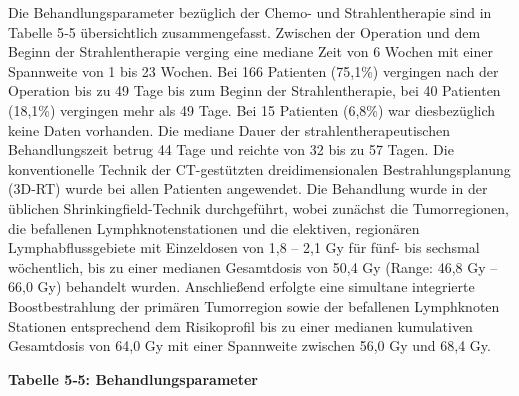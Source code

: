 Die Behandlungsparameter bezüglich der Chemo- und Strahlentherapie sind in Tabelle 5‑5 übersichtlich zusammengefasst. Zwischen der Operation und dem Beginn der Strahlentherapie verging eine mediane Zeit von 6 Wochen mit einer Spannweite von 1 bis 23 Wochen. Bei 166 Patienten (75,1\%) vergingen nach der Operation bis zu 49 Tage bis zum Beginn der Strahlentherapie, bei 40 Patienten (18,1\%) vergingen mehr als 49 Tage. Bei 15 Patienten (6,8\%) war diesbezüglich keine Daten vorhanden. Die mediane Dauer der strahlentherapeutischen Behandlungszeit betrug 44 Tage und reichte von 32 bis zu 57 Tagen. Die konventionelle Technik der CT-gestützten dreidimensionalen Bestrahlungsplanung (3D-RT) wurde bei allen Patienten angewendet. Die Behandlung wurde in der üblichen Shrinkingfield-Technik durchgeführt, wobei zunächst die Tumorregionen, die befallenen Lymphknotenstationen und die elektiven, regionären Lymphabflussgebiete mit Einzeldosen von 1,8 -- 2,1 Gy für fünf- bis sechsmal wöchentlich, bis zu einer medianen Gesamtdosis von 50,4 Gy (Range: 46,8 Gy -- 66,0 Gy) behandelt wurden. Anschließend erfolgte eine simultane integrierte Boostbestrahlung der primären Tumorregion sowie der befallenen Lymphknoten Stationen entsprechend dem Risikoprofil bis zu einer medianen kumulativen Gesamtdosis von 64,0 Gy mit einer Spannweite zwischen 56,0 Gy und 68,4 Gy.

\textbf{Tabelle 5‑5: Behandlungsparameter}

